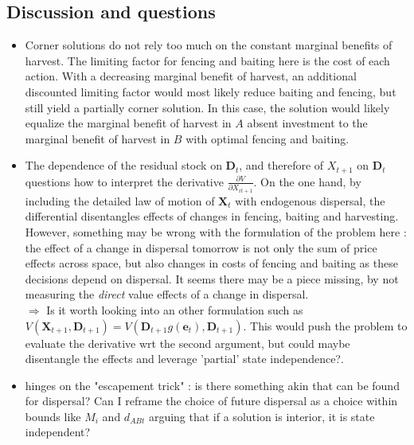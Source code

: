\documentclass{article}
\begin{document}
\subsection{Discussion and questions}
\begin{itemize}
\item Corner solutions do not rely too much on the constant marginal benefits of harvest. The limiting factor for fencing and baiting here is the cost of each action. With a decreasing marginal benefit of harvest, an additional discounted limiting factor would most likely reduce baiting and fencing, but still yield a partially corner solution. In this case, the solution would likely equalize the marginal benefit of harvest in $A$ absent investment to the marginal benefit of harvest in $B$ with optimal fencing and baiting. 

\item The dependence of the residual stock on $\mathbf{D}_t$, and therefore of $X_{t+1}$ on $\mathbf{D}_t$ questions how to interpret the derivative $\frac{\partial V}{\partial X_{it+1}}$. On the one hand, by including the detailed law of motion of $\mathbf{X}_t$ with endogenous dispersal, the differential disentangles effects of changes in fencing, baiting and harvesting. However, something may be wrong with the formulation of the problem here : the effect of a change in dispersal tomorrow is not only the sum of price effects across space, but also changes in costs of fencing and baiting as these decisions depend on dispersal. It seems there may be a piece missing, by not measuring the \textit{direct} value effects of a change in dispersal.\\
$\Rightarrow$ Is it worth looking into an other formulation such as $V(\mathbf{X}_{t+1}, \mathbf{D}_{t+1}) = V(\mathbf{D}_{t+1}g(\mathbf{e}_t), \mathbf{D}_{t+1})$. This would push the problem to evaluate the derivative wrt the second argument, but could maybe disentangle the effects and leverage 'partial' state independence?.
\item \cite{costello_optimal_2008} hinges on the "escapement trick" : is there something akin that can be found for dispersal? Can I reframe the choice of future dispersal as a choice within bounds like $M_i$ and $d_{ABt}$ arguing that if a solution is interior, it is state independent? 
\end{itemize}
\end{document}
